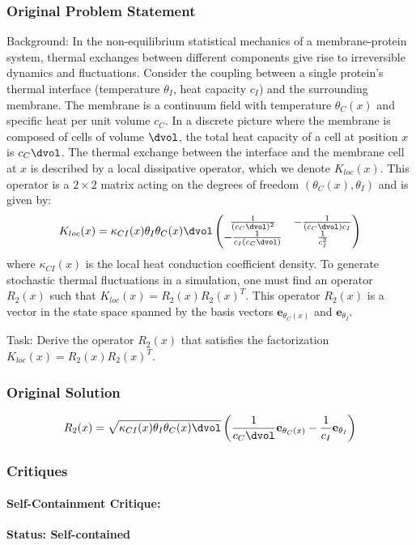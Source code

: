 \documentclass[10pt]{article}
\begin{document}
\subsubsection*{Original Problem Statement}
Background:
In the non-equilibrium statistical mechanics of a membrane-protein system, thermal exchanges between different components give rise to irreversible dynamics and fluctuations. Consider the coupling between a single protein's thermal interface (temperature $\theta_I$, heat capacity $c_I$) and the surrounding membrane. The membrane is a continuum field with temperature $\theta_C(x)$ and specific heat per unit volume $c_C$. In a discrete picture where the membrane is composed of cells of volume $\dvol$, the total heat capacity of a cell at position $x$ is $c_C \dvol$. The thermal exchange between the interface and the membrane cell at $x$ is described by a local dissipative operator, which we denote $K_{loc}(x)$. This operator is a $2 \times 2$ matrix acting on the degrees of freedom $(\theta_C(x), \theta_I)$ and is given by:
\begin{equation*}
K_{loc}(x) = \kappa_{CI}(x)\theta_I\theta_C(x)\dvol \begin{pmatrix} \frac{1}{(c_C \dvol)^2} & -\frac{1}{(c_C \dvol) c_I} \\ -\frac{1}{c_I (c_C \dvol)} & \frac{1}{c_I^2} \end{pmatrix}
\end{equation*}
where $\kappa_{CI}(x)$ is the local heat conduction coefficient density. To generate stochastic thermal fluctuations in a simulation, one must find an operator $R_2(x)$ such that $K_{loc}(x) = R_2(x) R_2(x)^T$. This operator $R_2(x)$ is a vector in the state space spanned by the basis vectors $\mathbf{e}_{\theta_C(x)}$ and $\mathbf{e}_{\theta_I}$.

Task:
Derive the operator $R_2(x)$ that satisfies the factorization $K_{loc}(x) = R_2(x) R_2(x)^T$.

\subsubsection*{Original Solution}
\[ R_{2}(x) = \sqrt{\kappa_{CI}(x)\theta_I\theta_C(x)\dvol} \left( \frac{1}{c_{C}\dvol} \mathbf{e}_{\theta_C(x)} - \frac{1}{c_{I}} \mathbf{e}_{\theta_I} \right) \]

\subsubsection*{Critiques}
\paragraph*{Self-Containment Critique:}
\textcolor{pass}{\textbf{Status: Self-contained}}
\end{document}
